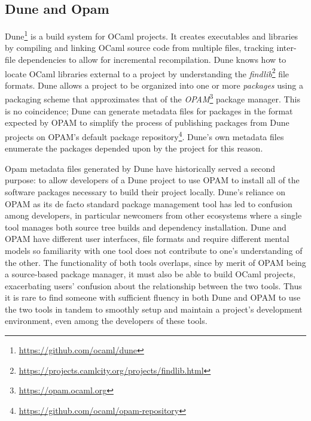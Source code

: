 \documentclass{article}
\begin{document}
    \begin{multicols}{2}

        \section{Dune and Opam}

        Dune\footnote{\url{https://github.com/ocaml/dune}} is a build system for OCaml
        projects. It creates executables and libraries by compiling and linking
        OCaml source code from multiple files, tracking inter-file dependencies
        to allow for incremental recompilation. Dune knows how to locate OCaml
        libraries external to a project by understanding the
        \textit{findlib}\footnote{\url{https://projects.camlcity.org/projects/findlib.html}}
        file formats. Dune allows a project to be organized into one or more
        \textit{packages} using a packaging scheme that approximates that of the
        \textit{OPAM}\footnote{\url{https://opam.ocaml.org}} package manager. This is
        no coincidence; Dune can generate metadata files for packages in the
        format expected by OPAM to simplify the process of publishing packages
        from Dune projects on OPAM's default package
        repository\footnote{\url{https://github.com/ocaml/opam-repository}}. Dune's
        own metadata files enumerate the packages depended upon by the project
        for this reason.

	Opam metadata files generated by Dune have historically served a second
	purpose: to allow developers of a Dune project to use OPAM to
	install all of the software packages necessary to build their
	project locally. Dune's reliance on OPAM as its de facto standard
	package management tool has led to confusion among developers, in
	particular newcomers from other ecosystems where a single tool
	manages both source tree builds and dependency installation. Dune
	and OPAM have different user interfaces, file formats and require
	different mental models so familiarity with one tool does not
	contribute to one's understanding of the other. The functionality
	of both tools overlaps, since by merit of OPAM being a source-based
	package manager, it must also be able to build OCaml projects,
	exacerbating users' confusion about the relationship between the
	two tools. Thus it is rare to find someone with sufficient fluency
	in both Dune and OPAM to use the two tools in tandem to smoothly
	setup and maintain a project's development environment, even among
	the developers of these tools.


\end{multicols}
\end{document}
